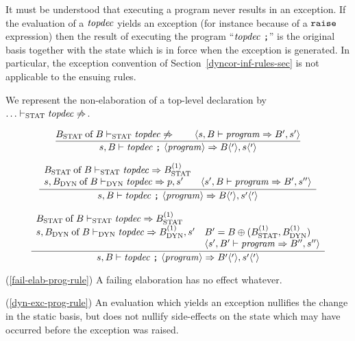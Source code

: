 It must be understood  that executing a program never results in an
exception. If the evaluation of a ${\it topdec}$ yields an exception 
(for instance because of a ${\tt raise}$ expression) then
the result of executing the program ``${\it topdec}\ \mbox{{\tt ;}}$'' is the
original basis together with the state which is in force when the exception is
generated. In particular, the exception convention of 
Section~\ref{dyncor-inf-rules-sec}
is not applicable to the ensuing rules.

We represent the non-elaboration of a top-level declaration by
 $\ldots\vdash_{\rm STAT}{\it topdec}\not\Rightarrow$. 

\begin{equation}            %
\label{fail-elab-prog-rule}
\frac{\of{\Bstat}{\B}\tsstat\topdec\not\ra\qquad
      \langle\s,\B\ts\program\ra\B',s'\rangle}
     {\s,\B\ts\longprog\ra\B\langle'\rangle,s\langle'\rangle}\index{65.2}
\end{equation}

\begin{equation}            %
\label{dyn-exc-prog-rule}
\frac{\begin{array}{lr}
      \of{\Bstat}{\B}\tsstat\topdec\ra\Bstat^{(1)} & \\
      \s,\of{\Bdyn}{\B}\tsdyn\topdec\ra\p,\s' &
                  \langle\s',\B\ts\program\ra\B',\s''\rangle
      \end{array}}
     {\s,\B\ts\longprog\ra\B\langle'\rangle,\s'\langle'\rangle}
\end{equation}

\begin{equation}            %
\label{success-prog-rule}
\frac{\begin{array}{ll}
       \of{\Bstat}{\B}\tsstat\topdec\ra\Bstat^{(1)} & \\
       \s,\of{\Bdyn}{\B}\tsdyn\topdec\ra\Bdyn^{(1)},s'&
                   \B'=\B\oplus(\Bstat^{(1)},\Bdyn^{(1)})\\
       &           \langle\s',\B'\ts\program\ra\B'',s''\rangle
      \end{array}
      }
      {\s,\B\ts\longprog\ra\B'\langle'\rangle,\s'\langle'\rangle}
\end{equation}
\comments
\begin{description}
\item{(\ref{fail-elab-prog-rule})}
  A failing elaboration has no effect whatever.
\item{(\ref{dyn-exc-prog-rule})}
  An evaluation which yields an exception nullifies
the change in the static basis, but does not
nullify side-effects on the state which may have occurred
before the exception was raised.
\end{description}
